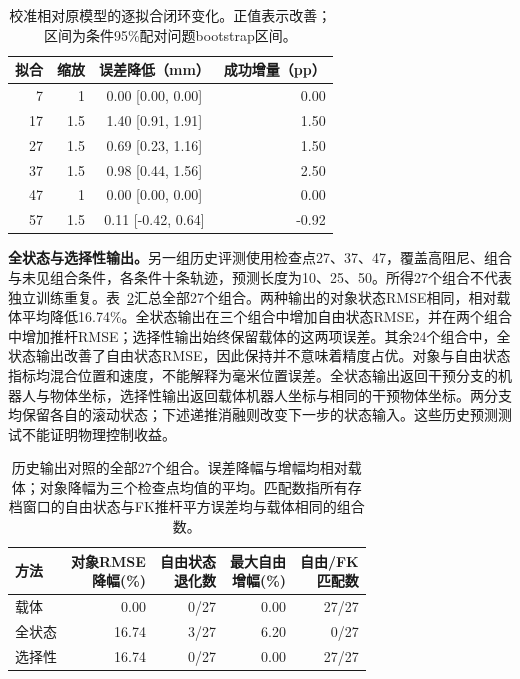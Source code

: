 \documentclass[UTF8,a4paper,10pt,twocolumn]{ctexart}
\begin{document}
\begin{table}[t]\centering\small
\caption{校准相对原模型的逐拟合闭环变化。正值表示改善；区间为条件95\%配对问题bootstrap区间。}\label{tab:calibration-fits}
\begin{tabular}{rrcr}\toprule
拟合 & 缩放 & 误差降低（mm） & 成功增量（pp）\\\midrule
7 & 1 & 0.00 [0.00, 0.00] & 0.00\\
17 & 1.5 & 1.40 [0.91, 1.91] & 1.50\\
27 & 1.5 & 0.69 [0.23, 1.16] & 1.50\\
37 & 1.5 & 0.98 [0.44, 1.56] & 2.50\\
47 & 1 & 0.00 [0.00, 0.00] & 0.00\\
57 & 1.5 & 0.11 [-0.42, 0.64] & -0.92\\
\bottomrule\end{tabular}\end{table}

\textbf{全状态与选择性输出。}另一组历史评测使用检查点27、37、47，覆盖高阻尼、组合与未见组合条件，各条件十条轨迹，预测长度为10、25、50。所得27个组合不代表独立训练重复。表~\ref{tab:historical-publication}汇总全部27个组合。两种输出的对象状态RMSE相同，相对载体平均降低16.74\%。全状态输出在三个组合中增加自由状态RMSE，并在两个组合中增加推杆RMSE；选择性输出始终保留载体的这两项误差。其余24个组合中，全状态输出改善了自由状态RMSE，因此保持并不意味着精度占优。对象与自由状态指标均混合位置和速度，不能解释为毫米位置误差。全状态输出返回干预分支的机器人与物体坐标，选择性输出返回载体机器人坐标与相同的干预物体坐标。两分支均保留各自的滚动状态；下述递推消融则改变下一步的状态输入。这些历史预测测试不能证明物理控制收益。

\begin{table}[t]\centering\small
\caption{历史输出对照的全部27个组合。误差降幅与增幅均相对载体；对象降幅为三个检查点均值的平均。匹配数指所有存档窗口的自由状态与FK推杆平方误差均与载体相同的组合数。}
\label{tab:historical-publication}
\setlength{\tabcolsep}{3pt}
\begin{tabular}{lrrrr}\toprule
方法 & \shortstack{对象RMSE\\降幅(\%)} & \shortstack{自由状态\\退化数} & \shortstack{最大自由\\增幅(\%)} & \shortstack{自由/FK\\匹配数}\\\midrule
载体 & 0.00 & 0/27 & 0.00 & 27/27\\
全状态 & 16.74 & 3/27 & 6.20 & 0/27\\
选择性 & 16.74 & 0/27 & 0.00 & 27/27\\
\bottomrule\end{tabular}\end{table}
\end{document}
